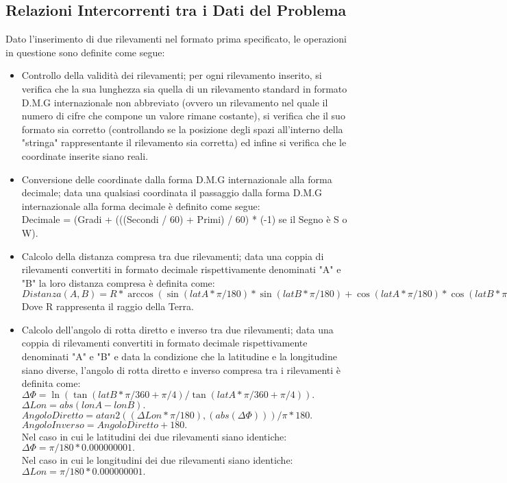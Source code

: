 \documentclass{article}
\begin{document}
\subsection{Relazioni Intercorrenti tra i Dati del Problema}
Dato l'inserimento di due rilevamenti nel formato prima specificato, le operazioni in questione sono definite come segue:
\begin{itemize}
	\item Controllo della validità dei rilevamenti; per ogni rilevamento inserito, si verifica che la sua lunghezza sia quella di un rilevamento standard in formato D.M.G internazionale non abbreviato (ovvero un rilevamento nel quale il numero di cifre che compone un valore rimane costante), si verifica che il suo formato sia corretto (controllando se la posizione degli spazi all'interno della "stringa" rappresentante il rilevamento sia corretta) ed infine si verifica che le coordinate inserite siano reali. 
	
	\item Conversione delle coordinate dalla forma D.M.G internazionale alla forma decimale; data una qualsiasi coordinata il passaggio dalla forma D.M.G internazionale alla forma decimale è definito come segue: \\
	Decimale = (Gradi + (((Secondi / 60) + Primi) / 60) * (-1) se il Segno è  S o W).
	
	\item Calcolo della distanza compresa tra due rilevamenti;  data una coppia di rilevamenti convertiti in formato decimale rispettivamente denominati "A" e "B" la loro distanza compresa è definita come: \\
	$Distanza(A, B) = R * \arccos(\sin(latA * \pi / 180) * \sin(latB * \pi / 180) + \cos(latA * \pi / 180) * \cos(latB * \pi / 180) * \cos((lonA - lonB) * \pi / 180)). $\\
	Dove R rappresenta il raggio della Terra.
	
	\item Calcolo dell'angolo di rotta diretto e inverso tra due rilevamenti; data una coppia di rilevamenti convertiti in formato decimale rispettivamente denominati "A" e "B" e data la condizione che la latitudine e la longitudine siano diverse, l'angolo di rotta diretto e inverso compresa tra i rilevamenti è definita come: \\
	$\Delta\Phi = \ln( \tan(latB * \pi / 360 + \pi / 4 ) / \tan(latA * \pi / 360 + \pi / 4 )). $\\
	$ \Delta Lon = abs(lonA - lonB). $ \\
	$ Angolo Diretto = atan2((\Delta Lon * \pi / 180), (abs(\Delta\Phi))) / \pi * 180. $\\
	$ Angolo Inverso = Angolo Diretto + 180.$\\
	Nel caso in cui le latitudini dei due rilevamenti siano identiche:\\
	$\Delta\Phi = \pi / 180 * 0.000000001.$\\
	Nel caso in cui le longitudini dei due rilevamenti siano identiche:\\
	$\Delta Lon = \pi / 180 * 0.000000001.$\\
\end{itemize}
\newpage
\end{document}

